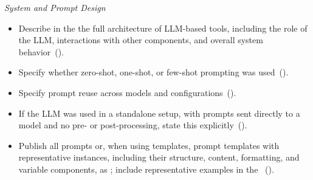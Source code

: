 \noindent\textit{System and Prompt Design}
\begin{itemize}[label={},leftmargin=*]
    \item \iconM Describe in the \paper the full architecture of LLM-based tools, including the role of the LLM, interactions with other components, and overall system behavior~().
    \item \iconM Specify whether zero-shot, one-shot, or few-shot prompting was used~().
    \item \iconM Specify prompt reuse across models and configurations~().
    \item \iconM If the LLM was used in a standalone setup, with prompts sent directly to a model and no pre- or post-processing, state this explicitly~().
    \item \iconM Publish all prompts or, when using templates, prompt templates with representative instances, including their structure, content, formatting, and variable components, as \supplementarymaterial; include representative examples in the \paper~().

\end{itemize}
